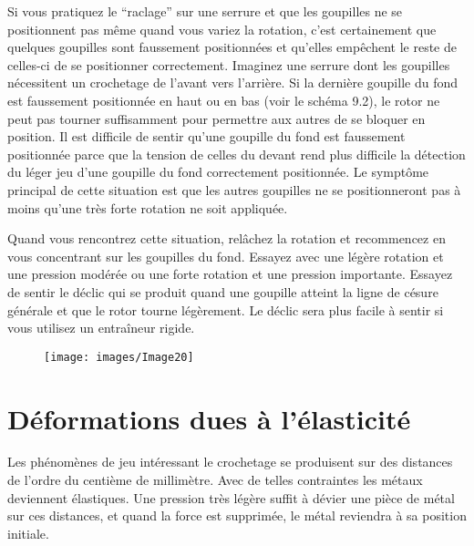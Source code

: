 \documentclass[a4paper,french,11pt,twoside]{report}
\begin{document}
Si vous pratiquez le \enquote{raclage} sur une serrure et que les goupilles ne se positionnent pas même quand vous variez la rotation, c'est certainement que quelques goupilles sont faussement positionnées et qu'elles empêchent le reste de celles-ci de se positionner correctement. Imaginez une serrure dont les goupilles nécessitent un crochetage de l'avant vers l'arrière. Si la dernière goupille du fond est faussement positionnée en haut ou en bas (voir le schéma 9.2), le rotor ne peut pas tourner suffisamment pour permettre aux autres de se bloquer en position. Il est difficile de sentir qu'une goupille du fond est faussement positionnée parce que la tension de celles du devant rend plus difficile la détection du léger jeu d'une goupille du fond correctement positionnée. Le symptôme principal de cette situation est que les autres goupilles ne se positionneront pas à moins qu'une très forte rotation ne soit appliquée.

Quand vous rencontrez cette situation, relâchez la rotation et recommencez en vous concentrant sur les goupilles du fond. Essayez avec une légère rotation et une pression modérée ou une forte rotation et une pression importante. Essayez de sentir le déclic qui se produit quand une goupille atteint la ligne de césure générale et que le rotor tourne légèrement. Le déclic sera plus facile à sentir si vous utilisez un entraîneur rigide.


\begin{figure}[ht] \begin{center}
        \texttt{[image: images/Image20]}
        \caption{}
\end{center} \end{figure}


\section{Déformations dues à l'élasticité}

Les phénomènes de jeu intéressant le crochetage se produisent sur des distances de l'ordre du centième de millimètre. Avec de telles contraintes les métaux deviennent élastiques. Une pression très légère suffit à dévier une pièce de métal sur ces distances, et quand la force est supprimée, le métal reviendra à sa position initiale.
\end{document}
